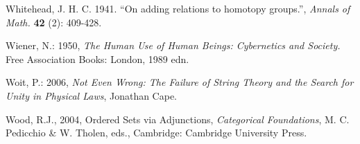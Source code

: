 \documentclass[12pt]{article}
\begin{document}
\begin{thebibliography}{399}
Whitehead, J. H. C. 1941. ``On adding relations to homotopy groups.'',
\emph{Annals of Math.} \textbf{42} (2): 409-428.

Wiener, N.: 1950, \emph{The Human Use of Human Beings: Cybernetics
and Society.} Free Association Books: London, 1989 edn.

Woit, P.: 2006, \emph{Not Even Wrong: The Failure of String Theory and the Search for Unity in Physical Laws}, Jonathan Cape.

Wood, R.J., 2004, Ordered Sets via Adjunctions, {\em Categorical Foundations}, M. C. Pedicchio \& W. Tholen, eds., Cambridge: Cambridge University Press. 

\end{thebibliography}

\end{document}
